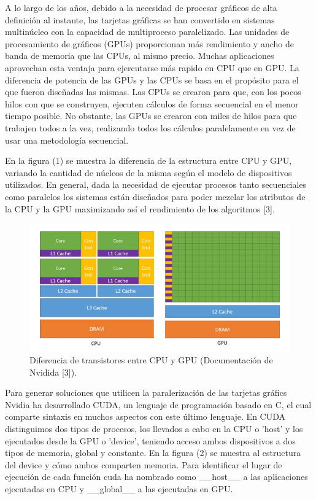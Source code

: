 \documentclass[11pt,a4paper,twoside,pdf]{article}
\numberwithin{equation}{section}
\begin{document}
A lo largo de los años, debido a la necesidad de procesar gráficos de alta definición al instante, las tarjetas gráficas se han convertido en sistemas multinúcleo con la capacidad de multiproceso paralelizado. Las unidades de procesamiento de gráficos (GPUs) proporcionan más rendimiento y ancho de banda de memoria que las CPUs, al mismo precio. Muchas aplicaciones aprovechan esta ventaja para ejercutarse más rapido en CPU que en GPU. La diferencia de potencia de las GPUs y las CPUs se basa en el propósito para el que fueron diseñadas las mismas. Las CPUs se crearon para que, con los pocos hilos con que se construyen, ejecuten cálculos de forma secuencial en el menor tiempo posible. No obstante, las GPUs se crearon con miles de hilos para que trabajen todos a la vez, realizando todos los cálculos paralelamente en vez de usar una metodología secuencial.

En la figura (1) se muestra la diferencia de la estructura entre CPU y GPU, variando la cantidad de núcleos de la misma según el modelo de dispositivos utilizados. En general, dada la necesidad de ejecutar procesos tanto secuenciales como paralelos los sistemas están diseñados para poder mezclar los atributos de la CPU y la GPU maximizando así el rendimiento de los algoritmos [3].

\begin{figure}[h]
\centering
\includegraphics[width=15cm]{Nvidia-CPU-GPU.jpg}				
\caption{Diferencia de transistores entre CPU y GPU (Documentación de Nvidida [3]). }
\end{figure}
\noindent

Para generar soluciones que utilicen la paralerización de las tarjetas gráfics Nvidia ha desarrollado CUDA, un lenguaje de programación basado en C, el cual comparte sintaxis en muchos aspectos con este último lenguaje. En CUDA distinguimos dos tipos de procesos, los llevados a cabo en la CPU o 'host' y los ejecutados desde la GPU o 'device', teniendo acceso ambos dispositivos a dos tipos de memoria, global y constante. En la figura (2) se muestra al estructura del device y cómo ambos comparten memoria. Para identificar el lugar de ejecución de cada función cuda ha nombrado como \_\_host\_\_ a las aplicaciones ejecutadas en CPU y \_\_global\_\_ a las ejecutadas en GPU.
\end{document}

